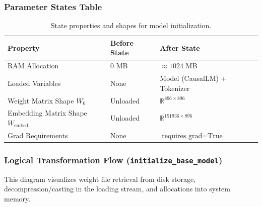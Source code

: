 \documentclass{article}
\begin{document}
\subsubsection{Parameter States Table}
\begin{table}[h]
\centering
\begin{tabular}{lll}
\toprule
\textbf{Property} & \textbf{Before State} & \textbf{After State} \\
\midrule
RAM Allocation & $0$ MB & $\approx 1024$ MB \\
Loaded Variables & None & Model (CausalLM) + Tokenizer \\
Weight Matrix Shape $W_0$ & Unloaded & $\mathbb{R}^{896 \times 896}$ \\
Embedding Matrix Shape $W_{\text{embed}}$ & Unloaded & $\mathbb{R}^{151936 \times 896}$ \\
Grad Requirements & None & $\text{requires\_grad} = \text{True}$ \\
\bottomrule
\end{tabular}
\caption{State properties and shapes for model initialization.}
\end{table}

\newpage
\subsubsection{Logical Transformation Flow (\texttt{initialize\_base\_model})}
This diagram visualizes weight file retrieval from disk storage, decompression/casting in the loading stream, and allocations into system memory.
\end{document}
